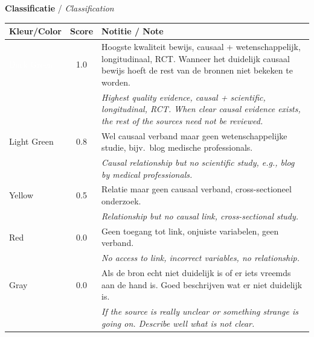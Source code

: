 \begin{table}[htbp]
\vspace{1em}

\textbf{Classificatie} / \textit{Classification}

\vspace{0.5em}

\begin{tabular}{|>{\columncolor{green!70!black}\color{white}}p{2cm}|c|p{8cm}|}
\hline
\textbf{Kleur/Color} & \textbf{Score} & \textbf{Notitie / Note} \\
\hline
\cellcolor{green!70!black}\textcolor{white}{Dark Green} & 1.0 & 
Hoogste kwaliteit bewijs, causaal + wetenschappelijk, longitudinaal, RCT. Wanneer het duidelijk causaal bewijs hoeft de rest van de bronnen niet bekeken te worden. \\
& & \textit{Highest quality evidence, causal + scientific, longitudinal, RCT. When clear causal evidence exists, the rest of the sources need not be reviewed.} \\
\hline
\cellcolor{green!50} Light Green & 0.8 & 
Wel causaal verband maar geen wetenschappelijke studie, bijv.\ blog medische professionals. \\
& & \textit{Causal relationship but no scientific study, e.g., blog by medical professionals.} \\
\hline
\cellcolor{yellow!80} Yellow & 0.5 & 
Relatie maar geen causaal verband, cross-sectioneel onderzoek. \\
& & \textit{Relationship but no causal link, cross-sectional study.} \\
\hline
\cellcolor{red!70} Red & 0.0 & 
Geen toegang tot link, onjuiste variabelen, geen verband. \\
& & \textit{No access to link, incorrect variables, no relationship.} \\
\hline
\cellcolor{gray!50} Gray & 0.0 & 
Als de bron echt niet duidelijk is of er iets vreemds aan de hand is. Goed beschrijven wat er niet duidelijk is. \\
& & \textit{If the source is really unclear or something strange is going on. Describe well what is not clear.} \\
\hline
\end{tabular}

\end{table}



